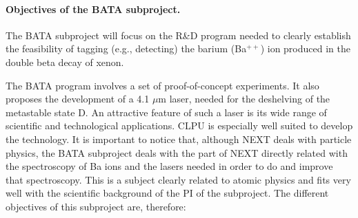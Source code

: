 \paragraph{Objectives of the BATA subproject.}

The BATA subproject will focus on the R\&D program needed to clearly establish the feasibility of tagging (e.g., detecting) the barium (Ba$^{++}$) ion produced in the double beta decay of xenon. 

The BATA program involves a set of proof-of-concept experiments. It also proposes the development of a 4.1 $\mu$m laser, needed for the deshelving of the metastable state D. An attractive feature of such a laser is its wide range of scientific and technological applications. CLPU is especially well suited to develop the technology. It is important to notice that, although NEXT deals with particle physics, the BATA subproject deals with the part of NEXT directly related with the spectroscopy of Ba ions and the lasers needed in order to do and improve that spectroscopy. This is a subject clearly related to atomic physics and fits very well with the scientific background of the PI of the subproject. The different objectives of this subproject are, therefore:


